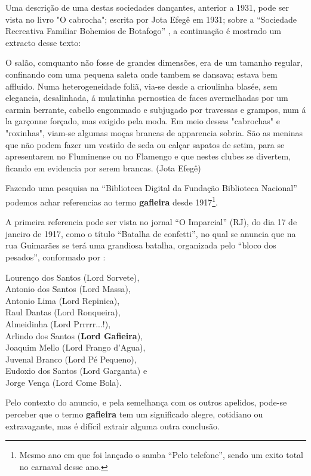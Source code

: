 Uma descrição de uma destas sociedades dançantes, anterior a 1931, pode ser vista no livro "O cabrocha"; 
escrita  por Jota Efegê em 1931; 
sobre a ``Sociedade Recreativa Familiar Bohemios de Botafogo'' \cite[pp. 24-26]{jotaefege},
a continuação é mostrado um extracto desse texto:
\begin{citando}%
O salão, comquanto não fosse de grandes dimensões, era
de um tamanho regular, confinando com uma pequena saleta
onde tambem se dansava; estava bem affluido. Numa
heterogeneidade foliã, via-se desde a crioulinha blasée, sem
elegancia, desalinhada, á mulatinha pernostica de faces
avermelhadas por um carmin berrante, cabello engommado e
subjugado por travessas e grampos, num á la garçonne
forçado, mas exigido pela moda. Em meio dessas "cabrochas"
e "roxinhas", viam-se algumas moças brancas de apparencia
sobria. São as meninas que não podem fazer um vestido de
seda ou calçar sapatos de setim, para se apresentarem no
Fluminense ou no Flamengo e que nestes clubes se divertem,
ficando em evidencia por serem brancas.  %
(Jota Efegê)
\end{citando}


Fazendo uma pesquisa na ``Biblioteca Digital da Fundação Biblioteca Nacional''
podemos achar referencias ao termo \textbf{gafieira} desde 1917\footnote{Mesmo 
ano em que foi lançado o samba ``Pelo telefone'', sendo um exito total no carnaval desse ano.}.


A primeira referencia pode ser vista no jornal ``O Imparcial'' (RJ),
do dia 17 de janeiro de 1917, como o título ``Batalha de confetti'',
no qual se anuncia que na rua Guimarães se terá uma grandiosa batalha,
organizada pelo ``bloco dos pesados'', conformado por \cite[pp. 4]{oldgafieira1} \cite[pp. 629]{spielmann2016reflexoes}:
\begin{citando}
Lourenço dos Santos (Lord Sorvete),\\
Antonio dos Santos (Lord Massa),\\
Antonio Lima (Lord Repinica),\\
Raul Dantas (Lord Ronqueira),\\
Almeidinha (Lord Prrrrr...!),\\
Arlindo dos Santos (\textbf{Lord Gafieira}),\\
Joaquim Mello (Lord Frango d'Agua),\\
Juvenal Branco (Lord Pé Pequeno),\\
Eudoxio dos Santos (Lord Garganta) e\\
Jorge Vença (Lord Come Bola).
\end{citando}
Pelo contexto do anuncio, e pela semelhança com os outros apelidos, 
pode-se perceber que o termo \textbf{gafieira} tem um significado alegre,
cotidiano ou extravagante, mas é difícil extrair alguma outra conclusão.


